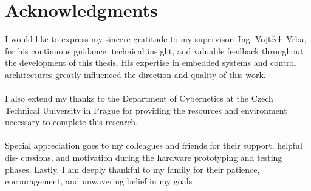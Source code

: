 
\section*{Acknowledgments}

I would like to express my sincere gratitude to my supervisor, Ing. Vojtěch Vrba, for his continuous guidance, technical insight, and valuable feedback throughout the development of this thesis. His expertise in embedded systems and control architectures greatly influenced the direction and quality of this work.
\\
\\
I also extend my thanks to the Department of Cybernetics at the Czech Technical University in Prague for providing the resources and environment necessary to complete this research. 
\\
\\
Special appreciation goes to my colleagues and friends for their support, helpful dis- cussions, and motivation during the hardware prototyping and testing phases. Lastly, I am deeply thankful to my family for their patience, encouragement, and unwavering belief in my goals

\vspace{2.5cm}

